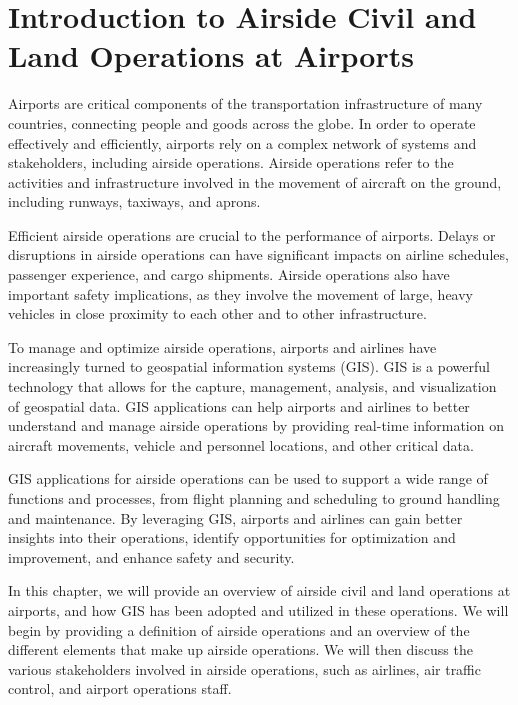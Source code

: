 
\setchapterpreamble[u]{\margintoc}

\chapter{Introduction to Airside Civil and Land Operations at Airports}%
\label{chap:airsideintro}

\graphicspath{{./figs}}

Airports are critical components of the transportation infrastructure of many countries, connecting people and goods across the globe. In order to operate effectively and efficiently, airports rely on a complex network of systems and stakeholders, including airside operations. Airside operations refer to the activities and infrastructure involved in the movement of aircraft on the ground, including runways, taxiways, and aprons.

Efficient airside operations are crucial to the performance of airports. Delays or disruptions in airside operations can have significant impacts on airline schedules, passenger experience, and cargo shipments. Airside operations also have important safety implications, as they involve the movement of large, heavy vehicles in close proximity to each other and to other infrastructure.

To manage and optimize airside operations, airports and airlines have increasingly turned to geospatial information systems (GIS). GIS is a powerful technology that allows for the capture, management, analysis, and visualization of geospatial data. GIS applications can help airports and airlines to better understand and manage airside operations by providing real-time information on aircraft movements, vehicle and personnel locations, and other critical data.

GIS applications for airside operations can be used to support a wide range of functions and processes, from flight planning and scheduling to ground handling and maintenance. By leveraging GIS, airports and airlines can gain better insights into their operations, identify opportunities for optimization and improvement, and enhance safety and security.

In this chapter, we will provide an overview of airside civil and land operations at airports, and how GIS has been adopted and utilized in these operations. We will begin by providing a definition of airside operations and an overview of the different elements that make up airside operations. We will then discuss the various stakeholders involved in airside operations, such as airlines, air traffic control, and airport operations staff.

